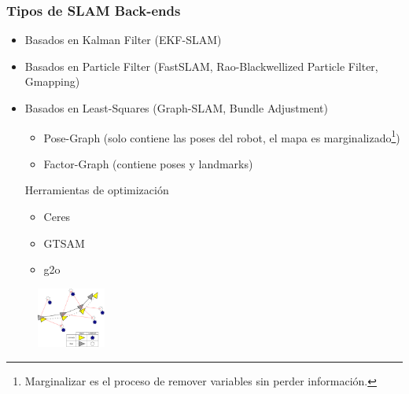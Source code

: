 \begin{frame}
    \frametitle{Tipos de SLAM Back-ends}
    \begin{itemize}
        \item Basados en Kalman Filter (EKF-SLAM)
        \item Basados en Particle Filter (FastSLAM, Rao-Blackwellized Particle Filter, Gmapping)
        \item Basados en Least-Squares (Graph-SLAM, Bundle Adjustment)
        \begin{itemize}
            \item Pose-Graph (solo contiene las poses del robot, el mapa es marginalizado\footnote{Marginalizar es el proceso de remover variables sin perder información.})
            \item Factor-Graph (contiene poses y landmarks)
        \end{itemize}
            Herramientas de optimización
            \begin{itemize}
            \item Ceres
            \item GTSAM
            \item g2o
            \end{itemize}
    \end{itemize}

	\begin{figure}[!h]
        \includegraphics[width=0.2\textwidth]{images/slam-landmarks.pdf}
    \end{figure}
    
\end{frame}

